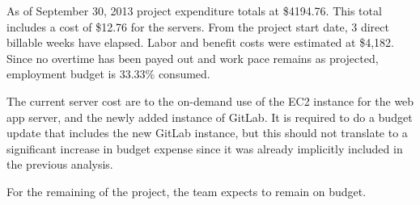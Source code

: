 



As of September 30, 2013 project expenditure totals at
\$4194.76. This total includes a cost of \$12.76 for the servers. From the
project start date, 3 direct billable weeks have elapsed. Labor and benefit
costs were estimated at \$4,182. Since no overtime has been payed out and work
pace remains as projected, employment budget is 33.33\% consumed.

The current server cost are to the on-demand use of the EC2 instance for the web
app server, and the newly added instance of GitLab. It is required to do a
budget update that includes the new GitLab instance, but this should not
translate to a significant increase in budget expense since it was already
implicitly included in the previous analysis.

For the remaining of the project, the team expects to remain on budget.